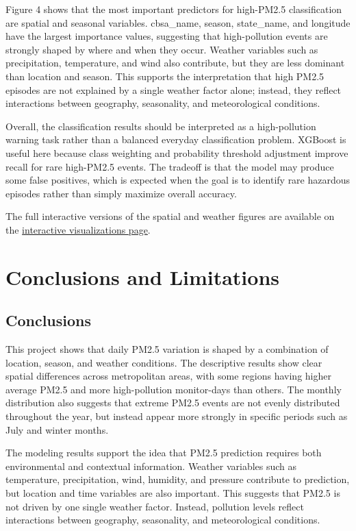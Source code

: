 \documentclass[
  letterpaper,
  DIV=11,
  numbers=noendperiod]{scrartcl}
\begin{document}
Figure 4 shows that the most important predictors for high-PM2.5
classification are spatial and seasonal variables. cbsa\_name, season,
state\_name, and longitude have the largest importance values,
suggesting that high-pollution events are strongly shaped by where and
when they occur. Weather variables such as precipitation, temperature,
and wind also contribute, but they are less dominant than location and
season. This supports the interpretation that high PM2.5 episodes are
not explained by a single weather factor alone; instead, they reflect
interactions between geography, seasonality, and meteorological
conditions.

Overall, the classification results should be interpreted as a
high-pollution warning task rather than a balanced everyday
classification problem. XGBoost is useful here because class weighting
and probability threshold adjustment improve recall for rare high-PM2.5
events. The tradeoff is that the model may produce some false positives,
which is expected when the goal is to identify rare hazardous episodes
rather than simply maximize overall accuracy.

The full interactive versions of the spatial and weather figures are
available on the \href{visualizations.html}{interactive visualizations
page}.

\section{Conclusions and Limitations}\label{conclusions-and-limitations}

\subsection{Conclusions}\label{conclusions}

This project shows that daily PM2.5 variation is shaped by a combination
of location, season, and weather conditions. The descriptive results
show clear spatial differences across metropolitan areas, with some
regions having higher average PM2.5 and more high-pollution monitor-days
than others. The monthly distribution also suggests that extreme PM2.5
events are not evenly distributed throughout the year, but instead
appear more strongly in specific periods such as July and winter months.

The modeling results support the idea that PM2.5 prediction requires
both environmental and contextual information. Weather variables such as
temperature, precipitation, wind, humidity, and pressure contribute to
prediction, but location and time variables are also important. This
suggests that PM2.5 is not driven by one single weather factor. Instead,
pollution levels reflect interactions between geography, seasonality,
and meteorological conditions.
\end{document}
